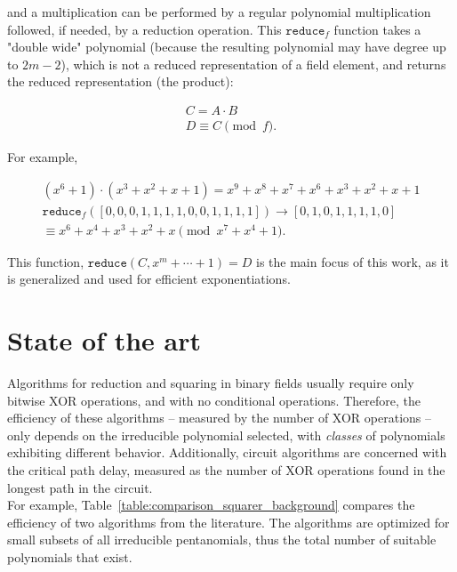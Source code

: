 \noindent and a multiplication can be performed by a regular polynomial multiplication followed, if needed, by a reduction operation. This $\texttt{reduce}_f$ function takes a "double wide" polynomial (because the resulting polynomial may have degree up to $2m-2$), which is not a reduced representation of a field element, and returns the reduced representation (the product):

\begin{gather*}
C = A \cdot B\\
D \equiv C \pmod f .
\end{gather*}

For example,

\begin{gather*}
(x^6+1) \cdot (x^3+x^2+x+1) = x^9 + x^8 + x^7 + x^6 + x^3 + x^2 + x + 1 \\
\texttt{reduce}_f([0, 0, 0, 1, 1, 1, 1, 0, 0, 1, 1, 1, 1]) \rightarrow [0, 1, 0, 1, 1, 1, 1, 0]\\
\equiv x^6 + x^4 + x^3 + x^2 + x \pmod{x^7+x^4+1}.
\end{gather*}

This function, $\texttt{reduce}(C, x^m+ \cdots +1) = D$ is the main focus of this work, as it is generalized and used for efficient exponentiations.


\section{State of the art} \label{stateoftheart}

Algorithms for reduction and squaring in binary fields usually require only bitwise XOR operations, and with no conditional operations. Therefore, the efficiency of these algorithms -- measured by the number of XOR operations -- only depends on the irreducible polynomial selected, with \emph{classes} of polynomials exhibiting different behavior. Additionally, circuit algorithms are concerned with the critical path delay, measured as the number of XOR operations found in the longest path in the circuit. \\

For example, Table~\ref{table:comparison_squarer_background} compares the efficiency of two algorithms from the literature. The algorithms are optimized for small subsets of all irreducible pentanomials, thus the total number of suitable polynomials that exist. \\

